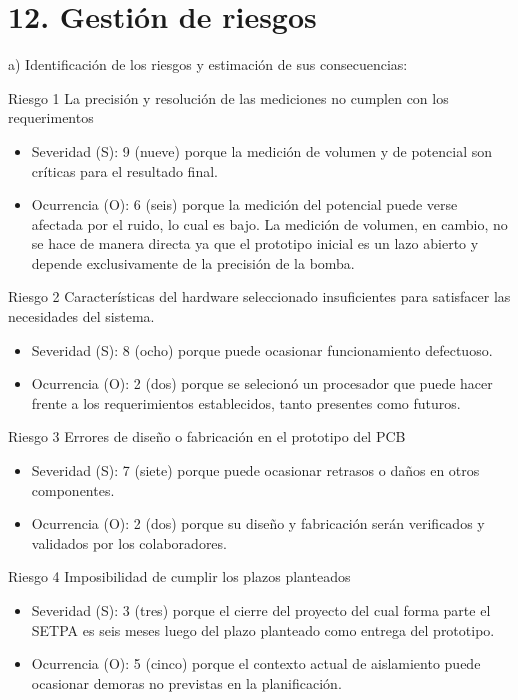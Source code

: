 \documentclass[11pt]{charter}
\begin{document}
\section{12. Gestión de riesgos}
\label{sec:riesgos}

a) Identificación de los riesgos y estimación de sus consecuencias:
 
Riesgo 1 La precisión y resolución de las mediciones no cumplen con los requerimentos
\begin{itemize}
\item Severidad (S): 9 (nueve) porque la medición de volumen y de potencial son críticas para el resultado final.
\item Ocurrencia (O): 6 (seis) porque la medición del potencial puede verse afectada por el ruido, lo cual es bajo. La medición de volumen, en cambio, no se hace de manera directa ya que el prototipo inicial es un lazo abierto y depende exclusivamente de la precisión de la bomba.
\end{itemize} 

Riesgo 2 Características del hardware seleccionado insuficientes para satisfacer las necesidades del sistema.
\begin{itemize}
\item Severidad (S): 8 (ocho) porque puede ocasionar funcionamiento defectuoso.
\item Ocurrencia (O): 2 (dos) porque se selecionó un procesador que puede hacer frente a los requerimientos establecidos, tanto presentes como futuros.
\end{itemize} 

Riesgo 3 Errores de diseño o fabricación en el prototipo del PCB
\begin{itemize}
\item Severidad (S): 7 (siete) porque puede ocasionar retrasos o daños en otros componentes.
\item Ocurrencia (O): 2 (dos) porque su diseño y fabricación serán verificados y validados por los colaboradores.
\end{itemize} 

\vspace{75px}

Riesgo 4 Imposibilidad de cumplir los plazos planteados
\begin{itemize}
\item Severidad (S): 3 (tres) porque el cierre del proyecto del cual forma parte el SETPA es seis meses luego del plazo planteado como entrega del prototipo.
\item Ocurrencia (O): 5 (cinco) porque el contexto actual de aislamiento puede ocasionar demoras no previstas en la planificación.
\end{itemize} 
\end{document}
